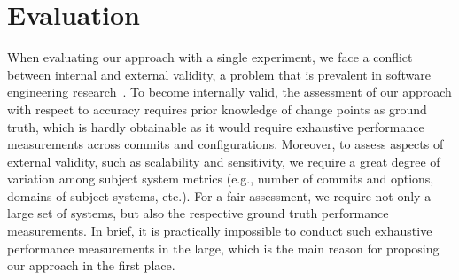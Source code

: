 \documentclass[sigconf]{acmart}
\begin{document}

	
	\section{Evaluation}
	When evaluating our approach with a single experiment, we face a conflict between internal and external validity, a problem that is prevalent in software engineering research~\cite{siegmund_views_2015}. 
	To become internally valid, the assessment of our approach with respect to accuracy requires prior knowledge of change points as ground truth, which is hardly obtainable as it would require exhaustive performance measurements across commits and configurations. Moreover, to assess aspects of external validity, such as scalability and sensitivity, we require a great degree of variation among subject system metrics (e.g., number of commits and options, domains of subject systems, etc.). 
	For a fair assessment, we require not only a large set of systems, but also the respective ground truth performance measurements. In brief, it is practically impossible to conduct such exhaustive performance measurements in the large, which is the main reason for proposing our approach in the first place.
	
\end{document}

